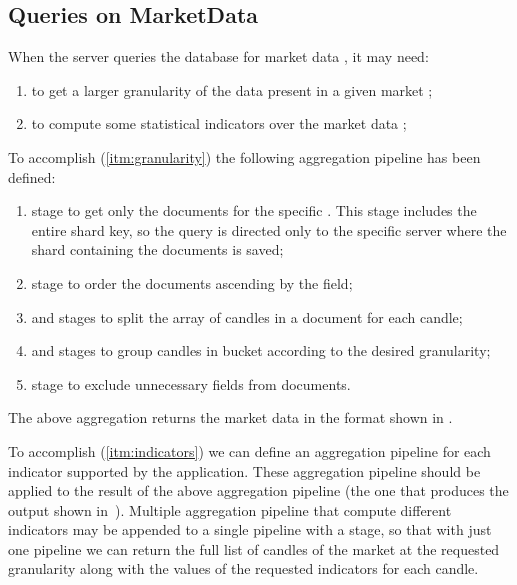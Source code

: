 \subsection{Queries on MarketData}

When the server queries the database for market data , it may need:
\begin{enumerate}
	\item\label{itm:granularity} to get a larger granularity of the data
		present in a given market ;
	\item\label{itm:indicators} to compute some statistical indicators over
		the market data ;
\end{enumerate}

To accomplish (\ref{itm:granularity}) the following aggregation pipeline has
been defined:
\begin{enumerate}
	\item {} stage to get only the documents for the specific
		. This stage includes the entire shard key, so the
		query is directed only to the specific server where the shard
		containing the documents is saved;
	\item {} stage to order the documents ascending by the
		 field;
	\item {} and  stages to split the array
		of candles in a document for each candle;
	\item {} and  stages to group candles in
		bucket according to the desired granularity;
	\item {} stage to exclude unnecessary fields from
		documents.
\end{enumerate}

The above aggregation returns the market data in the format shown in
.



To accomplish (\ref{itm:indicators}) we can define an aggregation pipeline for
each indicator supported by the application. These aggregation pipeline should
be applied to the result of the above aggregation pipeline (the one that
produces the output shown in~). Multiple
aggregation pipeline that compute different indicators may be appended to a
single pipeline with a  stage, so that with just one pipeline we
can return the full list of candles of the market at the requested granularity
along with the values of the requested indicators for each candle.

